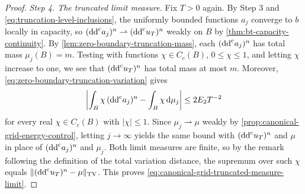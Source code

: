 \begin{proof}
\emph{Step 4. The truncated limit measure.}
Fix $T>0$ again. By Step 3 and \eqref{eq:truncation-level-inclusions}, the uniformly bounded functions $a_j$ converge to $b$ locally in capacity, so $(\mathrm{dd}^{\mathrm{c}} a_j)^n\rightharpoonup(\mathrm{dd}^{\mathrm{c}} u_T)^n$ weakly on $B$ by \cref{thm:bt-capacity-continuity}. By \cref{lem:zero-boundary-truncation-mass}, each $(\mathrm{dd}^{\mathrm{c}} a_j)^n$ has total mass $\mu_j(B)=m$. Testing with functions $\chi\in C_c(B)$, $0\leq\chi\leq1$, and letting $\chi$ increase to one, we see that $(\mathrm{dd}^{\mathrm{c}} u_T)^n$ has total mass at most $m$. Moreover, \eqref{eq:zero-boundary-truncation-variation} gives
\[
 \left|\int_B\chi\,(\mathrm{dd}^{\mathrm{c}} a_j)^n-\int_B\chi\,\mathrm d\mu_j\right|\leq2E_2T^{-2}
\]
for every real $\chi\in C_c(B)$ with $|\chi|\leq1$. Since $\mu_j\rightharpoonup\mu$ weakly by \cref{prop:canonical-grid-energy-control}, letting $j\to\infty$ yields the same bound with $(\mathrm{dd}^{\mathrm{c}} u_T)^n$ and $\mu$ in place of $(\mathrm{dd}^{\mathrm{c}} a_j)^n$ and $\mu_j$. Both limit measures are finite, so by the remark following the definition of the total variation distance, the supremum over such $\chi$ equals $\|(\mathrm{dd}^{\mathrm{c}} u_T)^n-\mu\|_{\mathrm{TV}}$. This proves \eqref{eq:canonical-grid-truncated-measure-limit}.
\end{proof}
